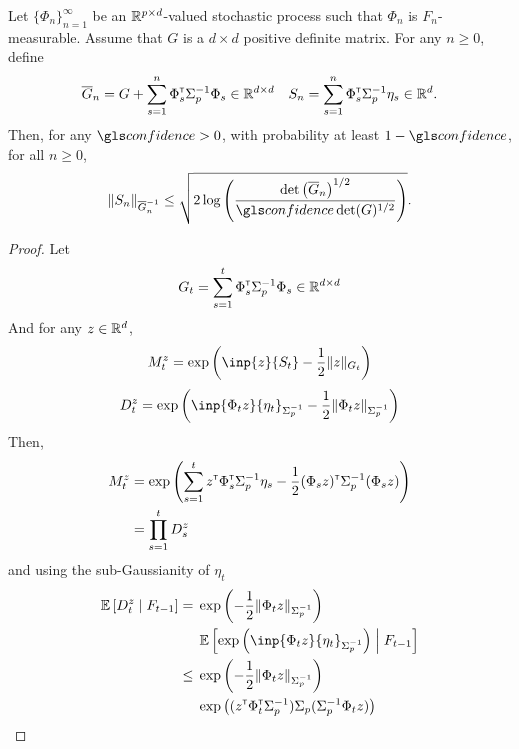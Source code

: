 \begin{subappendices}
\begin{proposition}
\begin{leftbar}[propositionbar]
		Let $\{\Phi_n\}_{n=1}^\infty$ be an $\mathbb{R}^{p\times d}$-valued stochastic process such that $\Phi_n$ is $F_n$-measurable. Assume that $G$ is a $d\times d$ positive definite matrix. For any $n\geq 0$, define
		\begin{equation*}
		\overline{G}_n = G + \sum_{s=1}^n \Phi_s^{\mathsf{\scriptscriptstyle T}} \Sigma_p^{-1} \Phi_s \in \mathbb{R}^{d\times d} \quad S_n = \sum_{s=1}^n \Phi_s^{\mathsf{\scriptscriptstyle T}}\Sigma_p^{-1}\eta_s \in \mathbb{R}^{d}.
		\end{equation*}
		Then, for any $\confidence>0$, with probability at least $1-\confidence$, for all $n\geq0$,
		\begin{align*}
		\| S_n \|_{\overline{G}_n^{-1}} \leq \sqrt{2\log \left(\frac{\det\left(\overline{G}_n\right)^{1/2}}{\confidence\det(G)^{1/2}}\right)}.
		\end{align*}
		\end{leftbar}
	\end{proposition}
	\begin{proof}
		Let 
		\begin{equation*}
		G_t = \sum_{s=1}^t \Phi_s^{\mathsf{\scriptscriptstyle T}} \Sigma_p^{-1} \Phi_s \in \mathbb{R}^{d\times d}
		\end{equation*}
		And for any $z\in\mathbb{R}^d$,
		\begin{equation*}
		M_t^z = \exp{\left(\inp{z}{S_t} - \frac{1}{2}\|z\|_{G_t}\right)}
		\end{equation*}
		\begin{equation*}
		D_t^z = \exp{\left(\inp{\Phi_t z}{\eta_t}_{\Sigma_p^{-1}} - \frac{1}{2}\|\Phi_t z\|_{\Sigma_p^{-1}}\right)}
		\end{equation*}
		Then,
		\begin{align*}
		M_t^z &= \exp{\left(\sum_{s=1}^t z^{\mathsf{\scriptscriptstyle T}}\Phi_s^{\mathsf{\scriptscriptstyle T}}\Sigma_p^{-1} \eta_s - \frac{1}{2} (\Phi_s z)^{\mathsf{\scriptscriptstyle T}}\Sigma_p^{-1}(\Phi_s z) \right)} \\
		&= \prod_{s=1}^{t} D_s^z
		\end{align*}
		and using the sub-Gaussianity of $\eta_t$
		\begin{align*}
		\expectedvalue\left[D_t^z \condbar F_{t-1}\right] = {}& \exp{\left(- \frac{1}{2}\|\Phi_t z\|_{\Sigma_p^{-1}}\right)}\\ &\expectedvalue\left[\exp{\left(\inp{\Phi_t z}{\eta_t}_{\Sigma_p^{-1}}\right)} \condbar F_{t-1}\right]  \\
		\leq {} & \exp{\left(- \frac{1}{2}\|\Phi_t z\|_{\Sigma_p^{-1}}\right)}\\
		&\exp{\left((z^\transp \Phi_t^\transp \Sigma_p^{-1})\Sigma_p(\Sigma_p^{-1} \Phi_t z)\right)}\\

\end{align*}
\end{proof}
\end{subappendices}

